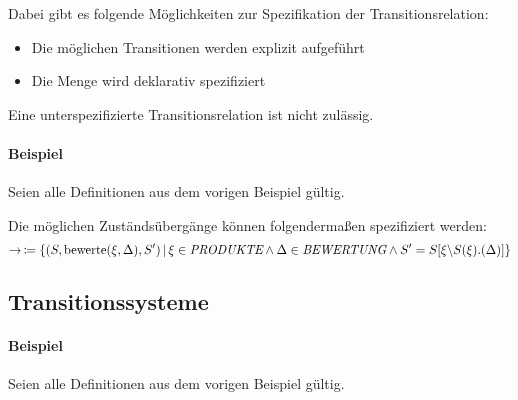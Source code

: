 		    Dabei gibt es folgende Möglichkeiten zur Spezifikation der Transitionsrelation:
		    \begin{itemize}
			    \item Die möglichen Transitionen werden explizit aufgeführt
			    \item Die Menge wird deklarativ spezifiziert
		    \end{itemize}
		    Eine unterspezifizierte Transitionsrelation ist nicht zulässig.
		    
		    \paragraph{Beispiel}
			    Seien alle Definitionen aus dem vorigen Beispiel gültig.
			    
			    Die möglichen Zuständsübergänge können folgendermaßen spezifiziert werden:
			    \begin{equation*}
				    \rightarrow\, \coloneqq \{ (S, \text{bewerte}(\xi, \Delta), S') \,\vert\, \xi \in \textit{PRODUKTE} \land \Delta \in \textit{BEWERTUNG} \land S' = S[\xi \backslash S(\xi).(\Delta)] \}
			    \end{equation*}
	    
	    \subsection{Transitionssysteme}
		    
	    
		    \paragraph{Beispiel}
			    Seien alle Definitionen aus dem vorigen Beispiel gültig.
			    
